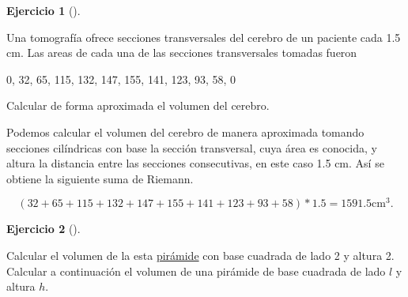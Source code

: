 \documentclass[
  spanish,
  a4paper,
]{scrreport}
\theoremstyle{definition}
\newtheorem{exercise}{Ejercicio}[chapter]
\theoremstyle{remark}
\begin{document}
\begin{exercise}[]\protect\hypertarget{exr-tomografía}{}\label{exr-tomografía}

Una tomografía ofrece secciones transversales del cerebro de un paciente
cada 1.5 cm. Las areas de cada una de las secciones transversales
tomadas fueron

0, 32, 65, 115, 132, 147, 155, 141, 123, 93, 58, 0

Calcular de forma aproximada el volumen del cerebro.

\end{exercise}

\begin{tcolorbox}[enhanced jigsaw, arc=.35mm, bottomrule=.15mm, bottomtitle=1mm, breakable, colback=white, colbacktitle=quarto-callout-tip-color!10!white, colframe=quarto-callout-tip-color-frame, coltitle=black, left=2mm, leftrule=.75mm, opacityback=0, opacitybacktitle=0.6, rightrule=.15mm, title=\textcolor{quarto-callout-tip-color}{\faLightbulb}\hspace{0.5em}{Solución}, titlerule=0mm, toprule=.15mm, toptitle=1mm]

Podemos calcular el volumen del cerebro de manera aproximada tomando
secciones cilíndricas con base la sección transversal, cuya área es
conocida, y altura la distancia entre las secciones consecutivas, en
este caso 1.5 cm. Así se obtiene la siguiente suma de Riemann.

\[ 
(32 + 65 + 115 + 132 + 147 + 155 + 141 + 123 + 93 + 58) * 1.5 = 1591.5 \mbox{cm}^3.
\]

\end{tcolorbox}

\begin{exercise}[]\protect\hypertarget{exr-volumen-piramide}{}\label{exr-volumen-piramide}

Calcular el volumen de la esta
\href{https://www.geogebra.org/m/g2wu3tqw}{pirámide} con base cuadrada
de lado 2 y altura 2. Calcular a continuación el volumen de una pirámide
de base cuadrada de lado \(l\) y altura \(h\).

\end{exercise}
\end{document}
